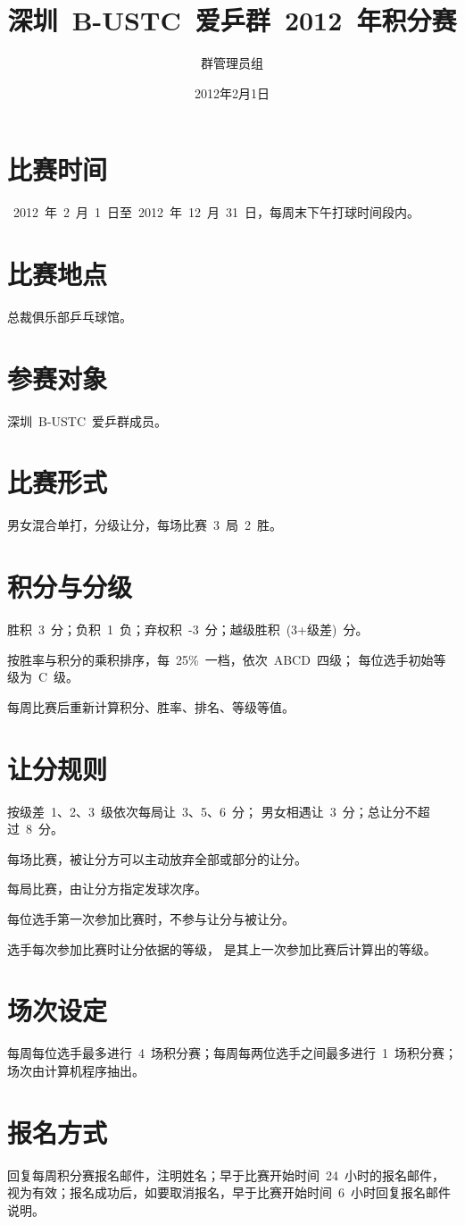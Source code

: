 \documentclass[11pt]{article}
\title{深圳~B-USTC~爱乒群~2012~年积分赛}
\author{\CK 群管理员组}
\date{\CK 2012年2月1日}     %
\begin{document}
\CW
\maketitle

\CS
\section{\CW 比赛时间}
\par ~2012~年~2~月~1~日至~2012~年~12~月~31~日，每周末下午打球时间段内。

\section{\CW 比赛地点}
\par 总裁俱乐部乒乓球馆。

\section{\CW 参赛对象}
\par 深圳~B-USTC~爱乒群成员。

\section{\CW 比赛形式}
\par 男女混合单打，分级让分，每场比赛~3~局~2~胜。

\section{\CW 积分与分级}
\par 胜积~3~分；负积~1~负；弃权积~-3~分；越级胜积~(3+级差)~分。
\par 按胜率与积分的乘积排序，每~25\%~一档，依次~ABCD~四级；
每位选手初始等级为~C~级。
\par 每周比赛后重新计算积分、胜率、排名、等级等值。

\section{\CW 让分规则}
\par 按级差~1、2、3~级依次每局让~3、5、6~分；
男女相遇让~3~分；总让分不超过~8~分。
\par 每场比赛，被让分方可以主动放弃全部或部分的让分。
\par 每局比赛，由让分方指定发球次序。
\par 每位选手第一次参加比赛时，不参与让分与被让分。
\par 选手每次参加比赛时让分依据的等级，
是其上一次参加比赛后计算出的等级。

\section{\CW 场次设定}
\par 每周每位选手最多进行~4~场积分赛；每周每两位选手之间最多进行~1~场积分赛；
场次由计算机程序抽出。

\section{\CW 报名方式}
\par 回复每周积分赛报名邮件，注明姓名；早于比赛开始时间~24~小时的报名邮件，
视为有效；报名成功后，如要取消报名，早于比赛开始时间~6~小时回复报名邮件说明。
\end{document}
